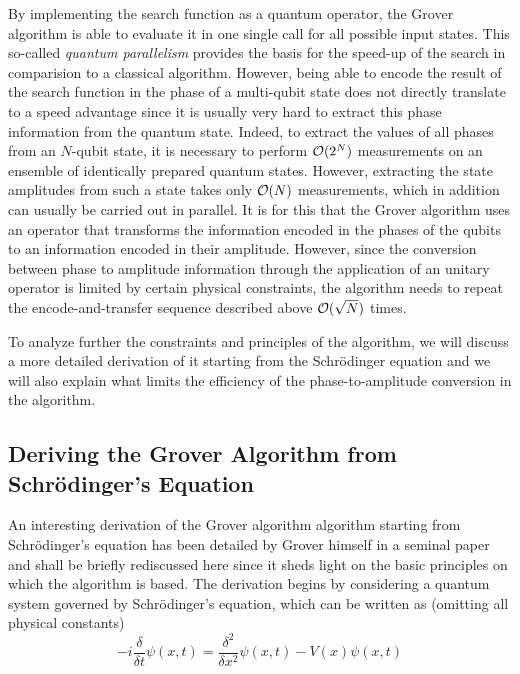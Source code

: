By implementing the search function as a quantum operator, the Grover algorithm is able to evaluate it in one single call for all possible input states. This so-called {\it quantum parallelism} provides the basis for the speed-up of the search in comparision to a classical algorithm. However, being able to encode the result of the search function in the phase of a multi-qubit state does not directly translate to a speed advantage since it is usually very hard to extract this phase information from the quantum state. Indeed, to extract the values of all phases from an $N$-qubit state, it is necessary to perform $\begin{mathcal}O(2^N)\end{mathcal}$ measurements on an ensemble of identically prepared quantum states. However, extracting the state amplitudes from such a state takes only $\begin{mathcal}O\end{mathcal}(N)$ measurements, which in addition can usually be carried out in parallel. It is for this that the Grover algorithm uses an operator that transforms the information encoded in the phases of the qubits to an information encoded in their amplitude. However, since the conversion between phase to amplitude information through the application of an unitary operator is limited by certain physical constraints, the algorithm needs to repeat the encode-and-transfer sequence described above $\begin{mathcal}O(\sqrt{N})\end{mathcal}$ times. 

\smallskip

To analyze further the constraints and principles of the algorithm, we will discuss a more detailed derivation of it starting from the Schrödinger equation and we will also explain what limits the efficiency of the phase-to-amplitude conversion in the algorithm.

\subsection{Deriving the Grover Algorithm from Schrödinger's Equation}


An interesting derivation of the Grover algorithm algorithm starting from Schrödinger's equation has been detailed by Grover himself in a seminal paper \citep{grover_schrodingers_2001} and shall be briefly rediscussed here since it sheds light on the basic principles on which the algorithm is based. The derivation begins by considering a quantum system governed by Schrödinger's equation, which can be written as (omitting all physical constants)
%
\begin{equation}
-i\frac{\delta}{\delta t}\psi(x,t) = \frac{\delta^2}{\delta x^2}\psi(x,t)-V(x)\psi(x,t) \label{eq:grover_derivation}
\end{equation}
%

